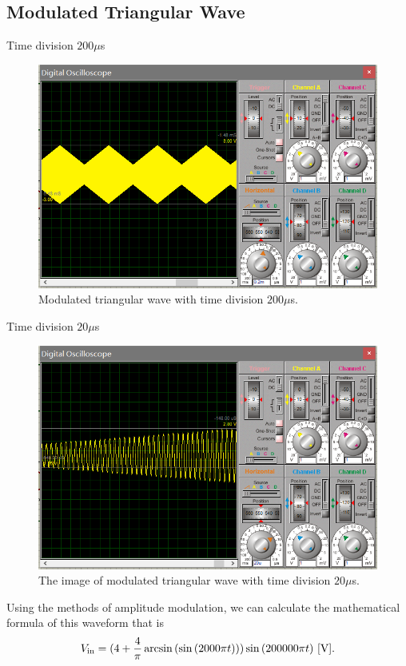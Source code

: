 \documentclass[a4paper]{article}
\begin{document}
\subsection{Modulated Triangular Wave}
Time division $200\mu$s
\begin{figure}[H]
	\centering
	\includegraphics[width=0.8\linewidth]{18.png}
	\caption{Modulated triangular wave with time division $200\mu$s.}
\end{figure}
Time division $20\mu$s
\begin{figure}[H]
	\centering
	\includegraphics[width=0.8\linewidth]{19.png}
	\caption{The image of modulated triangular wave with time division $20\mu$s.}
\end{figure}
Using the methods of amplitude modulation, we can calculate the mathematical formula of this waveform that is
$$V_\text{in}=(4+\frac{4}{\pi}\arcsin{(\sin{(2000\pi t)})})\sin{(200000\pi t)}\ \rm{[V]}.$$
\end{document}
